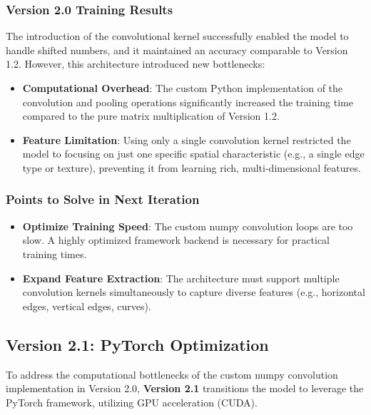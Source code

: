 \documentclass[12pt,a4paper]{article}
\begin{document}
\subsubsection{Version 2.0 Training Results}
The introduction of the convolutional kernel successfully enabled the model to handle shifted numbers, and it maintained an accuracy comparable to Version 1.2. However, this architecture introduced new bottlenecks:
\begin{itemize}
    \item \textbf{Computational Overhead}: The custom Python implementation of the convolution and pooling operations significantly increased the training time compared to the pure matrix multiplication of Version 1.2.
    \item \textbf{Feature Limitation}: Using only a single convolution kernel restricted the model to focusing on just one specific spatial characteristic (e.g., a single edge type or texture), preventing it from learning rich, multi-dimensional features.
\end{itemize}

\subsubsection{Points to Solve in Next Iteration}
\begin{itemize}
    \item \textbf{Optimize Training Speed}: The custom numpy convolution loops are too slow. A highly optimized framework backend is necessary for practical training times.
    \item \textbf{Expand Feature Extraction}: The architecture must support multiple convolution kernels simultaneously to capture diverse features (e.g., horizontal edges, vertical edges, curves).
\end{itemize}

\subsection{Version 2.1: PyTorch Optimization}
To address the computational bottlenecks of the custom numpy convolution implementation in Version 2.0, \textbf{Version 2.1} transitions the model to leverage the PyTorch framework, utilizing GPU acceleration (CUDA).
\end{document}

